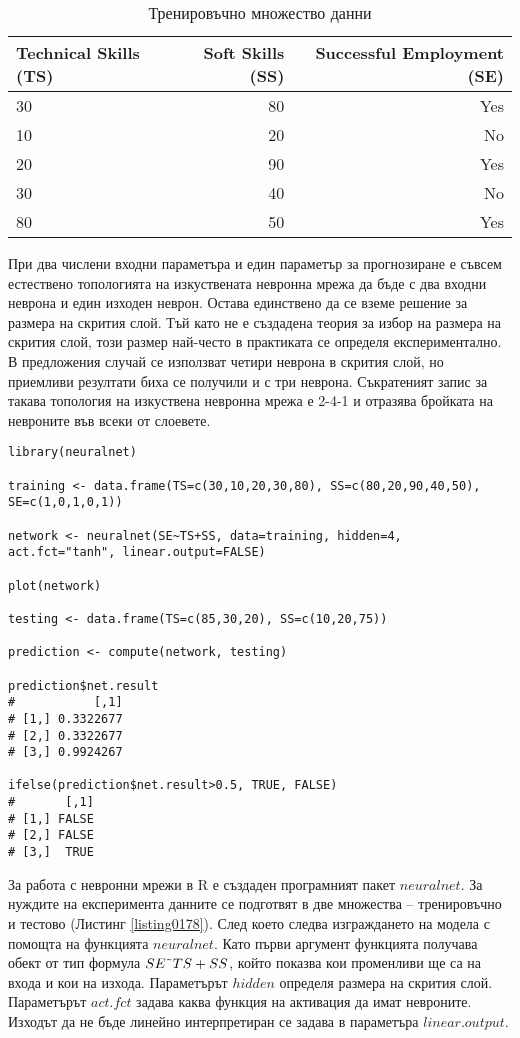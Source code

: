 \begin{table}[h!]
\centering
\begin{tabular}{|l|r|r|} 
	\rowcolor{lightgray}
	\hline
	Technical Skills (TS) & Soft Skills (SS) & Successful Employment (SE) \\
	\hline\hline
	30 & 80 & Yes \\
	\hline
	10 & 20 & No \\
	\hline
	20 & 90 & Yes \\
	\hline
	30 & 40 & No \\
	\hline
	80 & 50 & Yes \\
	\hline
\end{tabular}
\caption{Тренировъчно множество данни}
\label{table0007}
\end{table}

При два числени входни параметъра и един параметър за прогнозиране е съвсем естествено топологията на изкуствената невронна мрежа да бъде с два входни неврона и един изходен неврон. Остава единствено да се вземе решение за размера на скрития слой. Тъй като не е създадена теория за избор на размера на скрития слой, този размер най-често в практиката се определя експериментално. В предложения случай се използват четири неврона в скрития слой, но приемливи резултати биха се получили и с три неврона. Съкратеният запис за такава топология на изкуствена невронна мрежа е 2-4-1 и отразява бройката на невроните във всеки от слоевете. 

\begin{lstlisting}[caption=Класифициране с изкуствена невронна мержа, label=listing0178]
library(neuralnet)

training <- data.frame(TS=c(30,10,20,30,80), SS=c(80,20,90,40,50), SE=c(1,0,1,0,1))

network <- neuralnet(SE~TS+SS, data=training, hidden=4, act.fct="tanh", linear.output=FALSE)

plot(network)

testing <- data.frame(TS=c(85,30,20), SS=c(10,20,75))

prediction <- compute(network, testing)

prediction$net.result
#           [,1]
# [1,] 0.3322677
# [2,] 0.3322677
# [3,] 0.9924267

ifelse(prediction$net.result>0.5, TRUE, FALSE)
#       [,1]
# [1,] FALSE
# [2,] FALSE
# [3,]  TRUE
\end{lstlisting}

За работа с невронни мрежи в R е създаден програмният пакет $neuralnet$. За нуждите на експеримента данните се подготвят в две множества – тренировъчно и тестово (Листинг \ref{listing0178}). След което следва изграждането на модела с помощта на функцията $neuralnet$. Като първи аргумент функцията получава обект от тип формула $SE\char`\~TS+SS$, който показва кои променливи ще са на входа и кои на изхода. Параметърът $hidden$ определя размера на скрития слой. Параметърът $act.fct$ задава каква функция на активация да имат невроните. Изходът да не бъде линейно интерпретиран се задава в параметъра $linear.output$.

